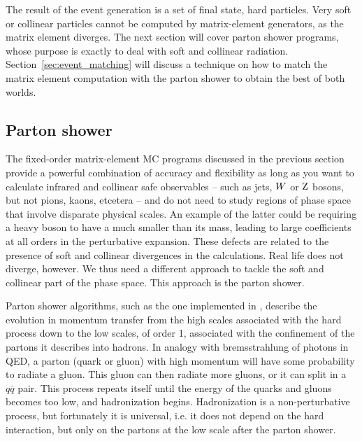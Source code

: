 The result of the event generation is a set of final state, hard particles. Very
soft or collinear particles cannot be computed by matrix-element generators, as the matrix element
diverges. The next section will cover parton shower programs, whose purpose is exactly to deal with
soft and collinear radiation. Section~\ref{sec:event_matching} will discuss a technique on how to
match the matrix element computation with the parton shower to obtain the best of both worlds. 



\subsection{Parton shower}

The fixed-order matrix-element MC programs discussed in the previous section provide a powerful
combination of accuracy and flexibility as long as you want to calculate infrared and collinear safe
observables -- such as jets, $W$ or $\mathrm{Z}$ bosons, but not pions, kaons, etcetera -- and
do not need to study regions of phase space that involve disparate physical scales. An example of
the latter could be requiring a heavy boson to have a \pt much smaller than its mass, leading to
large coefficients at all orders in the perturbative expansion.
These defects are related to the presence of soft and collinear divergences in the calculations.
Real life does not diverge, however. We thus need a different approach to tackle the soft and
collinear part of the phase space. This approach is the parton shower. 

Parton shower algorithms, such as the one implemented in \PYTHIA, describe the evolution in
momentum transfer from the high scales associated with the hard process down to the low scales, of
order 1\GeV, associated with the confinement of the partons it describes into hadrons. 
In analogy with bremsstrahlung of photons in QED, a parton (quark or gluon) with high momentum will
have some probability to radiate a gluon. This gluon can then radiate more gluons, or it can split
in a $q\bar{q}$ pair. This process repeats itself until the energy of the quarks and gluons becomes
too low, and hadronization begins. Hadronization is a non-perturbative process, but fortunately it
is universal, i.e. it does not depend on the hard interaction, but only on the partons at the low
scale after the parton shower.


